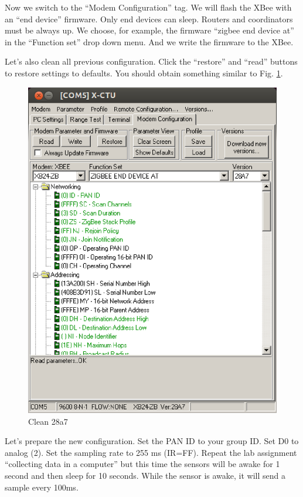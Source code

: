 Now we switch to the ``Modem Configuration'' tag.
We will flash the XBee with an ``end device'' firmware.
Only end devices can sleep.
Routers and coordinators must be always up.
We choose, for example, the firmware ``zigbee end device at'' in the ``Function set'' drop down menu.
And we write the firmware to the XBee.

Let's also clean all previous configuration.
Click the ``restore'' and ``read'' buttons to restore settings to defaults.
You should obtain something similar to Fig. \ref{fig:clean-28a7}.

\begin{figure}[htbp]
  \centering
  \includegraphics[width=0.3\linewidth]{figures/clean-28a7.eps}
  \caption{Clean 28a7}
  \label{fig:clean-28a7}
\end{figure}

Let's prepare the new configuration.
Set the PAN ID to your group ID.
Set D0 to analog (2).
Set the sampling rate to 255 ms (IR=FF).
Repeat the lab assignment ``collecting data in a computer'' but this time the sensors will be awake for 1 second and then sleep for 10 seconds.
While the sensor is awake, it will send a sample every 100ms.
